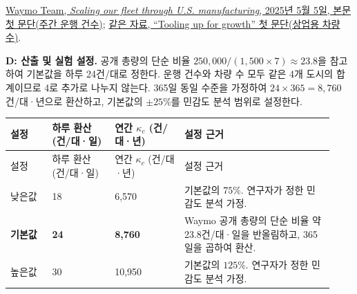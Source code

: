 \documentclass[10pt,a4paper]{article}
\begin{document}
\medskip
\noindent
\href{https://waymo.com/blog/2025/05/scaling-our-fleet-through-us-manufacturing/#:~:text=more\%20than\%20250\%2C000\%20paid\%20trips\%20each\%20week}
{Waymo Team, \textit{Scaling our fleet through U.S. manufacturing},
2025년 5월 5일, 본문 첫 문단(주간 운행 건수)};
\href{https://waymo.com/blog/2025/05/scaling-our-fleet-through-us-manufacturing/#:~:text=over\%201\%2C500\%20vehicles}
{같은 자료, ``Tooling up for growth'' 첫 문단(상업용 차량 수)}.

\medskip
\noindent
\textbf{D: 산출 및 실험 설정.}
공개 총량의 단순 비율
$250{,}000/(1{,}500\times7)\approx23.8$을 참고하여
기본값을 하루 24건/대로 정한다.
운행 건수와 차량 수 모두 같은 4개 도시의 합계이므로
4로 추가로 나누지 않는다.
365일 동일 수준을 가정하여
$24\times365=8{,}760$건/대·년으로 환산하고,
기본값의 $\pm25\%$를 민감도 분석 범위로 설정한다.

\begingroup
\small
\setlength{\tabcolsep}{4pt}
\renewcommand{\arraystretch}{1.2}

\begin{longtable}{@{}
    P{0.12\linewidth}
    P{0.18\linewidth}
    P{0.20\linewidth}
    P{0.43\linewidth}
@{}}
\toprule
설정
& 하루 환산 \newline (건/대·일)
& 연간 $\kappa_c$ \newline (건/대·년)
& 설정 근거 \\
\midrule
\endfirsthead

\toprule
설정
& 하루 환산 \newline (건/대·일)
& 연간 $\kappa_c$ \newline (건/대·년)
& 설정 근거 \\
\midrule
\endhead

낮은값
& 18
& 6,570
& 기본값의 $75\%$.
연구자가 정한 민감도 분석 가정. \\
\addlinespace

\textbf{기본값}
& \textbf{24}
& \textbf{8,760}
& Waymo 공개 총량의 단순 비율
약 23.8건/대·일을 반올림하고,
365일을 곱하여 환산. \\
\addlinespace

높은값
& 30
& 10,950
& 기본값의 $125\%$.
연구자가 정한 민감도 분석 가정. \\
\bottomrule
\end{longtable}

\endgroup

\end{document}
